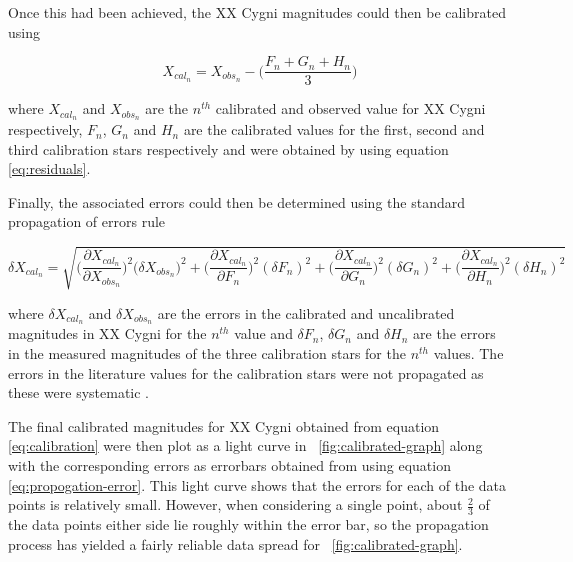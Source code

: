 \documentclass{article}
\newcommand{\figref}[2][\figurename~]{#1\ref{#2}}
\begin{document}
\vspace{2mm}
\noindent
Once this had been achieved, the XX Cygni magnitudes could then be calibrated using 

\begin{equation}
\label{eq:calibration}
X_{cal_n} = X_{obs_n} - \bigg(\frac{F_n + G_n + H_n}{3}\bigg)  
\end{equation}

\vspace{2mm}
\noindent
where $X_{cal_n}$ and $X_{obs_n}$ are the $n^{th}$ calibrated and observed value for XX Cygni respectively, $F_n$, $G_n$ and $H_n$ are the calibrated values for the first, second and third calibration stars respectively and were obtained by using equation \eqref{eq:residuals}. 

\vspace{2mm}
\noindent
Finally, the associated errors could then be determined using the standard propagation of errors rule

\begin{equation}
\label{eq:propogation-error}
\delta{X_{cal_n}} = \sqrt{\bigg(\frac{\partial{X_{cal_n}}}{\partial{X_{obs_n}}}\bigg)^2(\delta{X_{obs_n})^2} + \bigg(\frac{\partial{X_{cal_n}}}{\partial{F_{n}}}\bigg)^2(\delta{F_{n}})^2 + \bigg(\frac{\partial{X_{cal_n}}}{\partial{G_{n}}}\bigg)^2(\delta{G_{n}})^2 + \bigg(\frac{\partial{X_{cal_n}}}{\partial{H_{n}}}\bigg)^2(\delta{H_{n}})^2}
\end{equation}  

\vspace{2mm}
\noindent
where $\delta{X_{cal_n}}$ and $\delta{X_{obs_n}}$ are the errors in the calibrated and uncalibrated magnitudes in XX Cygni for the $n^{th}$ value and $\delta{F_{n}}$, $\delta{G_{n}}$ and $\delta{H_{n}}$ are the errors in the measured magnitudes of the three calibration stars for the $n^{th}$ values. The errors in the literature values \cite{Web03} for the calibration stars were not propagated as these were systematic \cite{Paper03}. 

\vspace{2mm}
\noindent
The final calibrated magnitudes for XX Cygni obtained from equation \eqref{eq:calibration} were then plot as a light curve in \figref{fig:calibrated-graph} along with the corresponding errors as errorbars obtained from using equation \eqref{eq:propogation-error}. This light curve shows that the errors for each of the data points is relatively small. However, when considering a single point, about $\frac{2}{3}$ of the data points either side lie roughly within the error bar, so the propagation process has yielded a fairly reliable data spread for \figref{fig:calibrated-graph}.
\end{document}
